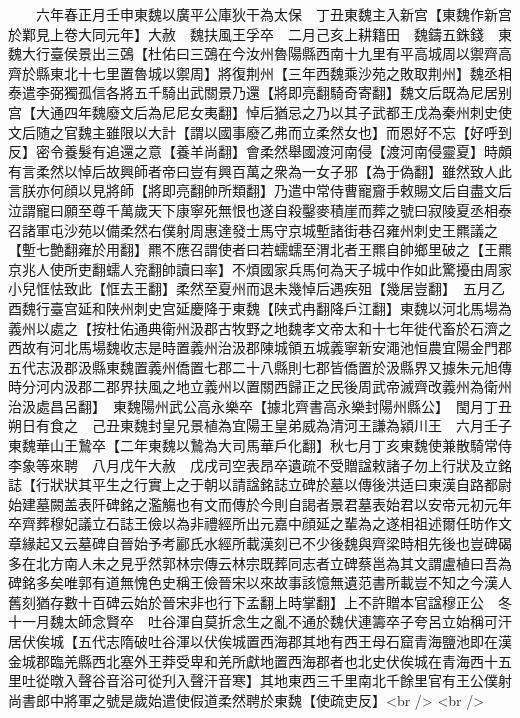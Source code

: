 　　六年春正月壬申東魏以廣平公庫狄干為太保　丁丑東魏主入新宫【東魏作新宫於鄴見上卷大同元年】大赦　魏扶風王孚卒　二月己亥上耕籍田　魏鑄五銖錢　東魏大行臺侯景出三鵶【杜佑曰三鵶在今汝州魯陽縣西南十九里有平高城周以禦齊高齊於縣東北十七里置魯城以禦周】將復荆州【三年西魏乘沙苑之敗取荆州】魏丞相泰遣李弼獨孤信各將五千騎出武關景乃還【將即亮翻騎奇寄翻】魏文后既為尼居别宫【大通四年魏廢文后為尼尼女夷翻】悼后猶忌之乃以其子武都王戊為秦州刺史使文后随之官魏主雖限以大計【謂以國事廢乙弗而立柔然女也】而恩好不忘【好呼到反】密令養髮有追還之意【養羊尚翻】會柔然舉國渡河南侵【渡河南侵靈夏】時頗有言柔然以悼后故興師者帝曰豈有興百萬之衆為一女子邪【為于偽翻】雖然致人此言朕亦何顔以見將師【將即亮翻帥所類翻】乃遣中常侍曹寵齎手敕賜文后自盡文后泣謂寵曰願至尊千萬歲天下康寧死無恨也遂自殺鑿麥積崖而葬之號曰寂陵夏丞相泰召諸軍屯沙苑以備柔然右僕射周惠達發士馬守京城塹諸街巷召雍州刺史王羆議之【塹七艶翻雍於用翻】羆不應召謂使者曰若蠕蠕至渭北者王羆自帥鄉里破之【王羆京兆人使所吏翻蠕人兖翻帥讀曰率】不煩國家兵馬何為天子城中作如此驚擾由周家小兒恇怯致此【恇去王翻】柔然至夏州而退未幾悼后遇疾殂【幾居豈翻】　五月乙酉魏行臺宫延和陕州刺史宫延慶降于東魏【陕式冉翻降戶江翻】東魏以河北馬場為義州以處之【按杜佑通典衛州汲郡古牧野之地魏孝文帝太和十七年徙代畜於石濟之西故有河北馬場魏收志是時置義州治汲郡陳城領五城義寧新安澠池恒農宜陽金門郡五代志汲郡汲縣東魏置義州僑置七郡二十八縣則七郡皆僑置於汲縣界又據朱元旭傳時分河内汲郡二郡界扶風之地立義州以置關西歸正之民後周武帝滅齊改義州為衛州治汲處昌呂翻】　東魏陽州武公高永樂卒【據北齊書高永樂封陽州縣公】　閠月丁丑朔日有食之　己丑東魏封皇兄景植為宜陽王皇弟威為清河王謙為潁川王　六月壬子東魏華山王鷙卒【二年東魏以鷙為大司馬華戶化翻】秋七月丁亥東魏使兼散騎常侍李象等來聘　八月戊午大赦　戊戌司空表昂卒遺疏不受贈諡敕諸子勿上行狀及立銘誌【行狀狀其平生之行實上之于朝以請諡銘誌立碑於墓以傳後洪适曰東漢自路都尉始建墓闕盖表阡碑銘之濫觴也有文而傳於今則自謁者景君墓表始君以安帝元初元年卒齊葬穆妃議立石誌王儉以為非禮經所出元嘉中顔延之輩為之遂相祖述爾任昉作文章緣起又云墓碑自晉始予考酈氏水經所載漢刻已不少後魏與齊梁時相先後也豈碑碣多在北方南人未之見乎然郭林宗傳云林宗既葬同志者立碑蔡邕為其文謂盧植曰吾為碑銘多矣唯郭有道無愧色史稱王儉晉宋以來故事該憶無遺范書所載豈不知之今漢人舊刻猶存數十百碑云始於晉宋非也行下孟翻上時掌翻】上不許贈本官諡穆正公　冬十一月魏太師念賢卒　吐谷渾自莫折念生之亂不通於魏伏連籌卒子夸呂立始稱可汗居伏俟城【五代志隋破吐谷渾以伏俟城置西海郡其地有西王母石窟青海鹽池即在漢金城郡臨羌縣西北塞外王莽受卑和羌所獻地置西海郡者也北史伏俟城在青海西十五里吐從暾入聲谷音浴可從刋入聲汗音寒】其地東西三千里南北千餘里官有王公僕射尚書郎中將軍之號是歲始遣使假道柔然聘於東魏【使疏吏反】<br />
<br />

